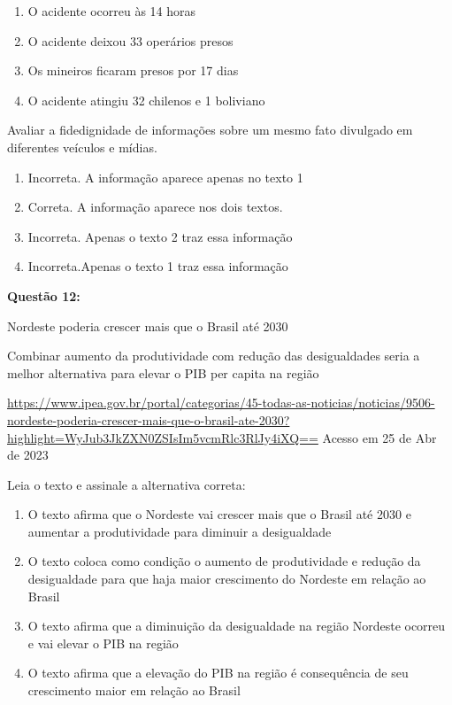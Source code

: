 \begin{enumerate}
\def\labelenumi{\alph{enumi})}
\item
  O acidente ocorreu às 14 horas
\item
  O acidente deixou 33 operários presos
\item
  Os mineiros ficaram presos por 17 dias
\item
  O acidente atingiu 32 chilenos e 1 boliviano
\end{enumerate}

Avaliar a fidedignidade de informações sobre um mesmo fato divulgado em
diferentes veículos e mídias.

\begin{enumerate}
\def\labelenumi{\alph{enumi})}
\item
  Incorreta. A informação aparece apenas no texto 1
\item
  Correta. A informação aparece nos dois textos.
\item
  Incorreta. Apenas o texto 2 traz essa informação
\item
  Incorreta.Apenas o texto 1 traz essa informação
\end{enumerate}

\textbf{Questão 12:}

Nordeste poderia crescer mais que o Brasil até 2030

Combinar aumento da produtividade com redução das desigualdades seria a
melhor alternativa para elevar o PIB per capita na região

\href{https://www.ipea.gov.br/portal/categorias/45-todas-as-noticias/noticias/9506-nordeste-poderia-crescer-mais-que-o-brasil-ate-2030?highlight=WyJub3JkZXN0ZSIsIm5vcmRlc3RlJy4iXQ==}{{https://www.ipea.gov.br/portal/categorias/45-todas-as-noticias/noticias/9506-nordeste-poderia-crescer-mais-que-o-brasil-ate-2030?highlight=WyJub3JkZXN0ZSIsIm5vcmRlc3RlJy4iXQ==}}
Acesso em 25 de Abr de 2023

Leia o texto e assinale a alternativa correta:

\begin{enumerate}
\def\labelenumi{\alph{enumi})}
\item
  O texto afirma que o Nordeste vai crescer mais que o Brasil até 2030 e
  aumentar a produtividade para diminuir a desigualdade
\item
  O texto coloca como condição o aumento de produtividade e redução da
  desigualdade para que haja maior crescimento do Nordeste em relação ao
  Brasil
\item
  O texto afirma que a diminuição da desigualdade na região Nordeste
  ocorreu e vai elevar o PIB na região
\item
  O texto afirma que a elevação do PIB na região é consequência de seu
  crescimento maior em relação ao Brasil
\end{enumerate}

